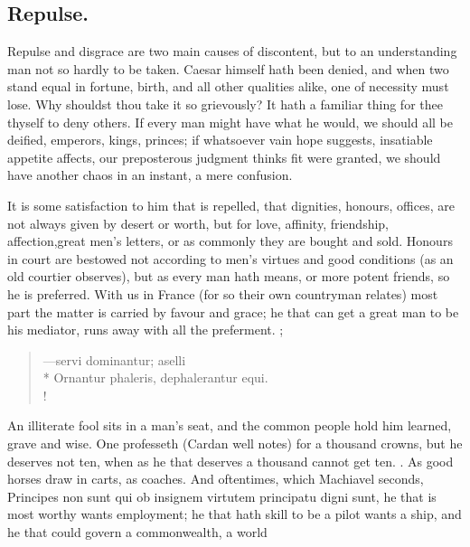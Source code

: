 {\subsection{Repulse.}
Repulse and disgrace are two main causes of discontent, but
to an understanding man not so hardly to be taken. Caesar himself hath
been denied, and when two stand equal in fortune, birth, and all
other qualities alike, one of necessity must lose. Why shouldst thou
take it so grievously? It hath a familiar thing for thee thyself to
deny others. If every man might have what he would, we should all be
deified, emperors, kings, princes; if whatsoever vain hope suggests,
insatiable appetite affects, our preposterous judgment thinks fit were
granted, we should have another chaos in an instant, a mere confusion.

It is some satisfaction to him that is repelled, that dignities,
honours, offices, are not always given by desert or worth, but for
love, affinity, friendship, affection,great men's letters, or as
commonly they are bought and sold. Honours in court are bestowed
not according to men's virtues and good conditions (as an old courtier
observes), but as every man hath means, or more potent friends, so he
is preferred. With us in France (for so their own countryman
relates) most part the matter is carried by favour and grace; he that
can get a great man to be his mediator, runs away with all the
preferment. ;
%
\begin{latin}%
\begin{verse}%
---servi dominantur; aselli\\*
Ornantur phaleris, dephalerantur equi.\\!
\end{verse}%
\end{latin}%
%
An illiterate fool sits in a man's seat, and the common people hold him
learned, grave and wise. One professeth (Cardan well notes) for a
thousand crowns, but he deserves not ten, when as he that deserves a
thousand cannot get ten. . As good horses
draw in carts, as coaches. And oftentimes, which Machiavel seconds,
 Principes non sunt qui ob insignem virtutem principatu digni
sunt, he that is most worthy wants employment; he that hath skill to be
a pilot wants a ship, and he that could govern a commonwealth, a world
}
